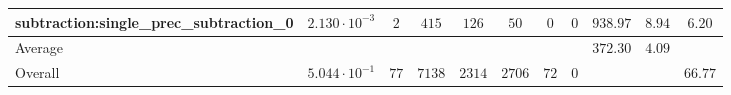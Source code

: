 \begin{tabular}{|l|c|c|c|c|c|c|c|c|c|c|}
subtraction:single\_prec\_subtraction\_0         & $ 2.130 \cdot 10^{-3} $ & $ 2      $ & $ 415  $ & $ 126  $ & $ 50    $ & $ 0  $ & $ 0 $ & $ 938.97      $ & $ 8.94    $ & $ 6.20    $ \\
\hline
Average                                          & $                     $ & $        $ & $      $ & $      $ & $       $ & $    $ & $   $ & $ 372.30      $ & $ 4.09    $ & $         $ \\
\hline
Overall                                          & $ 5.044 \cdot 10^{-1} $ & $ 77     $ & $ 7138 $ & $ 2314 $ & $ 2706  $ & $ 72 $ & $ 0 $ & $             $ & $         $ & $ 66.77   $ \\
\hline
\end{tabular}
